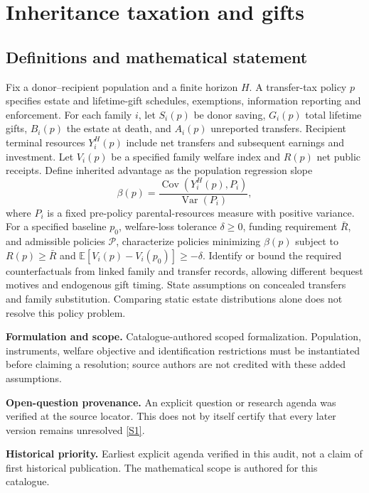 \documentclass[11pt]{article}
\newcommand{\sref}[2]{\hyperlink{source:#1:#2}{[S#2]}}
\begin{document}
\section*{Inheritance taxation and gifts}\label{30007755}
\subsection{Definitions and mathematical statement}
Fix a donor–recipient population and a finite horizon \(H\). A transfer-tax policy \(p\) specifies estate and lifetime-gift schedules, exemptions, information reporting and enforcement. For each family \(i\), let \(S_i(p)\) be donor saving, \(G_i(p)\) total lifetime gifts, \(B_i(p)\) the estate at death, and \(A_i(p)\) unreported transfers. Recipient terminal resources \(Y_i^H(p)\) include net transfers and subsequent earnings and investment. Let \(V_i(p)\) be a specified family welfare index and \(R(p)\) net public receipts. Define inherited advantage as the population regression slope
\[\beta(p)=\frac{\operatorname{Cov}(Y_i^H(p),P_i)}{\operatorname{Var}(P_i)},\]
where \(P_i\) is a fixed pre-policy parental-resources measure with positive variance. For a specified baseline \(p_0\), welfare-loss tolerance \(\delta\geq0\), funding requirement \(\bar R\), and admissible policies \(\mathcal P\), characterize policies minimizing \(\beta(p)\) subject to \(R(p)\geq\bar R\) and \(\mathbb E[V_i(p)-V_i(p_0)]\geq-\delta\). Identify or bound the required counterfactuals from linked family and transfer records, allowing different bequest motives and endogenous gift timing. State assumptions on concealed transfers and family substitution. Comparing static estate distributions alone does not resolve this policy problem.

\par\textbf{Formulation and scope.} Catalogue-authored scoped formalization. Population, instruments, welfare objective and identification restrictions must be instantiated before claiming a resolution; source authors are not credited with these added assumptions.

\par\textbf{Open-question provenance.} An explicit question or research agenda was verified at the source locator. This does not by itself certify that every later version remains unresolved \sref{30007755}{1}.

\par\textbf{Historical priority.} Earliest explicit agenda verified in this audit, not a claim of first historical publication. The mathematical scope is authored for this catalogue.
\end{document}
